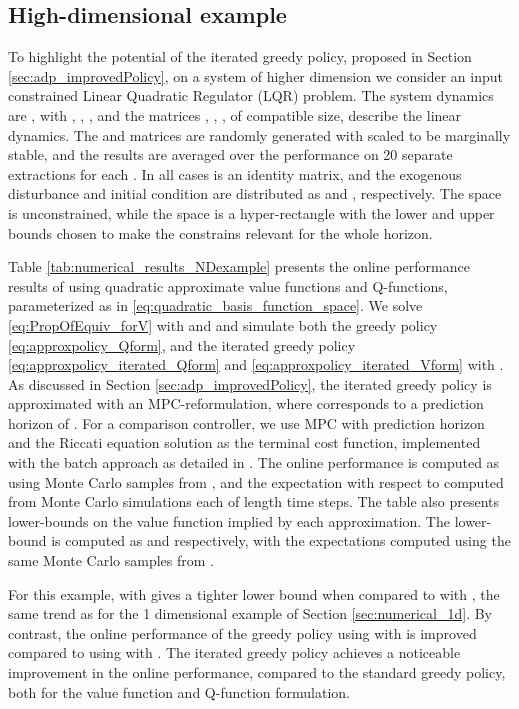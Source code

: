 \documentclass[journal]{IEEEtran}
\newcommand{\textQ}{Q}
\begin{document}
\subsection{High-dimensional example} \label{sec:numerical_nd}

To highlight the potential of the iterated greedy policy, proposed in Section \ref{sec:adp_improvedPolicy}, on a system of higher dimension we consider an input constrained Linear Quadratic Regulator (LQR) problem. The system dynamics are , with , , , and the matrices , , , of compatible size, describe the linear dynamics.
The  and  matrices are randomly generated with  scaled to be marginally stable, and the results are averaged over the performance on 20 separate extractions for each .
In all cases  is an identity matrix, and the exogenous disturbance and initial condition are distributed as  and , respectively.
The  space is unconstrained, while the  space is a hyper-rectangle with the lower and upper bounds chosen to make the constrains relevant for the whole horizon.



Table \ref{tab:numerical_results_NDexample} presents the online performance results of using quadratic approximate value functions and \textQ-functions, parameterized as in \eqref{eq:quadratic_basis_function_space}. We solve \eqref{eq:PropOfEquiv_forV} with  and  and simulate both the greedy policy \eqref{eq:approxpolicy_Qform}, and the iterated greedy policy \eqref{eq:approxpolicy_iterated_Qform} and \eqref{eq:approxpolicy_iterated_Vform} with . As discussed in Section \ref{sec:adp_improvedPolicy}, the iterated greedy policy is approximated with an MPC-reformulation, where  corresponds to a prediction horizon of . For a comparison controller, we use MPC with prediction horizon  and the Riccati equation solution as the terminal cost function, implemented with the batch approach as detailed in \cite[\S 8.2]{morari_2014_MPCBook}.
The online performance is computed as  using  Monte Carlo samples from , and the expectation with respect to  computed from  Monte Carlo simulations each of length  time steps.
The table also presents lower-bounds on the value function implied by each approximation. The lower-bound is computed as  and  respectively, with the expectations computed using the same  Monte Carlo samples from .


For this example,  with  gives a tighter lower bound when compared to  with , the same trend as for the 1 dimensional example of Section \ref{sec:numerical_1d}. By contrast, the online performance of the greedy policy using  with  is improved compared to using  with .
The iterated greedy policy achieves a noticeable improvement in the online performance, compared to the standard greedy policy, both for the value function and \textQ-function formulation.
\end{document}
